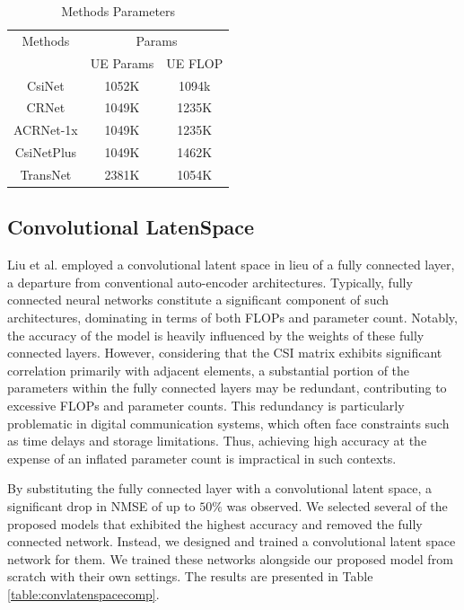\documentclass[lettersize,journal]{IEEEtran}
\begin{document}
\begin{table}[htb]
	\centering
	\caption{Methods Parameters}
	\label{table:methods_params}
	
	\begin{tabular}{ c|cc}
		\hline
		\multicolumn{1}{c|}{Methods}      & \multicolumn{2}{c}{Params}     \\
		
		& \multicolumn{1}{c}{UE Params }             & \multicolumn{1}{c}{UE FLOP} \\
		\hline
		CsiNet     & 1052K      & 1094k \\
		CRNet        & 1049K      & 1235K \\
		ACRNet-1x    & 1049K      & 1235K \\
		CsiNetPlus   & 1049K      & 1462K \\
		TransNet     & 2381K      & 1054K \\
		
		
	\end{tabular}
	
\end{table}


\subsection{Convolutional LatenSpace }

Liu et al. \cite{abp} employed a convolutional latent space in lieu of a fully connected layer, a departure from conventional auto-encoder architectures. Typically, fully connected neural networks constitute a significant component of such architectures, dominating in terms of both FLOPs and parameter count. Notably, the accuracy of the model is heavily influenced by the weights of these fully connected layers. However, considering that the CSI matrix exhibits significant correlation primarily with adjacent elements, a substantial portion of the parameters within the fully connected layers may be redundant, contributing to excessive FLOPs and parameter counts. This redundancy is particularly problematic in digital communication systems, which often face constraints such as time delays and storage limitations. Thus, achieving high accuracy at the expense of an inflated parameter count is impractical in such contexts.

By substituting the fully connected layer with a convolutional latent space, a significant drop in NMSE of up to 
\begin{math}50\%\end{math} was observed. We selected several of the proposed models that exhibited the highest accuracy and removed the fully connected network. Instead, we designed and trained a convolutional latent space network for them. We trained these networks alongside our proposed model from scratch with their own settings. The results are presented in Table \ref{table:convlatenspacecomp}.
\end{document}
